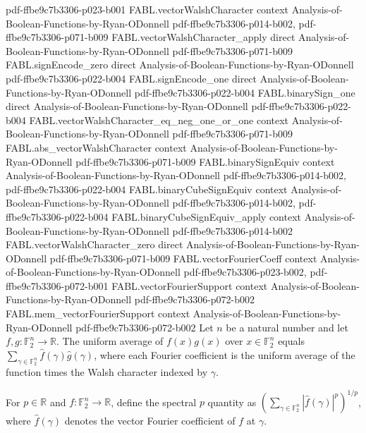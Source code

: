 \begin{theorem}
{    pdf-ffbe9c7b3306-p023-b001}
\proofstep
  {FABL.vectorWalshCharacter}
  {context}
  {Analysis-of-Boolean-Functions-by-Ryan-ODonnell}
  {pdf-ffbe9c7b3306-p014-b002,
    pdf-ffbe9c7b3306-p071-b009}
\proofstep
  {FABL.vectorWalshCharacter_apply}
  {direct}
  {Analysis-of-Boolean-Functions-by-Ryan-ODonnell}
  {pdf-ffbe9c7b3306-p071-b009}
\proofstep
  {FABL.signEncode_zero}
  {direct}
  {Analysis-of-Boolean-Functions-by-Ryan-ODonnell}
  {pdf-ffbe9c7b3306-p022-b004}
\proofstep
  {FABL.signEncode_one}
  {direct}
  {Analysis-of-Boolean-Functions-by-Ryan-ODonnell}
  {pdf-ffbe9c7b3306-p022-b004}
\proofstep
  {FABL.binarySign_one}
  {direct}
  {Analysis-of-Boolean-Functions-by-Ryan-ODonnell}
  {pdf-ffbe9c7b3306-p022-b004}
\proofstep
  {FABL.vectorWalshCharacter_eq_neg_one_or_one}
  {context}
  {Analysis-of-Boolean-Functions-by-Ryan-ODonnell}
  {pdf-ffbe9c7b3306-p071-b009}
\proofstep
  {FABL.abs_vectorWalshCharacter}
  {context}
  {Analysis-of-Boolean-Functions-by-Ryan-ODonnell}
  {pdf-ffbe9c7b3306-p071-b009}
\proofstep
  {FABL.binarySignEquiv}
  {context}
  {Analysis-of-Boolean-Functions-by-Ryan-ODonnell}
  {pdf-ffbe9c7b3306-p014-b002,
    pdf-ffbe9c7b3306-p022-b004}
\proofstep
  {FABL.binaryCubeSignEquiv}
  {context}
  {Analysis-of-Boolean-Functions-by-Ryan-ODonnell}
  {pdf-ffbe9c7b3306-p014-b002,
    pdf-ffbe9c7b3306-p022-b004}
\proofstep
  {FABL.binaryCubeSignEquiv_apply}
  {context}
  {Analysis-of-Boolean-Functions-by-Ryan-ODonnell}
  {pdf-ffbe9c7b3306-p014-b002}
\proofstep
  {FABL.vectorWalshCharacter_zero}
  {direct}
  {Analysis-of-Boolean-Functions-by-Ryan-ODonnell}
  {pdf-ffbe9c7b3306-p071-b009}
\proofstep
  {FABL.vectorFourierCoeff}
  {context}
  {Analysis-of-Boolean-Functions-by-Ryan-ODonnell}
  {pdf-ffbe9c7b3306-p023-b002,
    pdf-ffbe9c7b3306-p072-b001}
\proofstep
  {FABL.vectorFourierSupport}
  {context}
  {Analysis-of-Boolean-Functions-by-Ryan-ODonnell}
  {pdf-ffbe9c7b3306-p072-b002}
\proofstep
  {FABL.mem_vectorFourierSupport}
  {context}
  {Analysis-of-Boolean-Functions-by-Ryan-ODonnell}
  {pdf-ffbe9c7b3306-p072-b002}
Let $n$ be a natural number and let $f,g:\mathbb F_2^n\to\mathbb R$. The uniform average
of $f(x)g(x)$ over $x\in\mathbb F_2^n$ equals $\sum_{\gamma\in\mathbb F_2^n}\widehat
f(\gamma)\widehat g(\gamma)$, where each Fourier coefficient is the uniform average of
the function times the Walsh character indexed by $\gamma$.
\end{theorem}

\begin{definition}
\label{FABL.spectralPNorm}
\leanok
{}
For $p\in\mathbb{R}$ and $f:\mathbb{F}_2^n\to\mathbb{R}$, define the spectral $p$
quantity as $\left(\sum_{\gamma\in\mathbb{F}_2^n}|\widehat f(\gamma)|^p\right)^{1/p}$,
where $\widehat f(\gamma)$ denotes the vector Fourier coefficient of $f$ at $\gamma$.
\end{definition}

